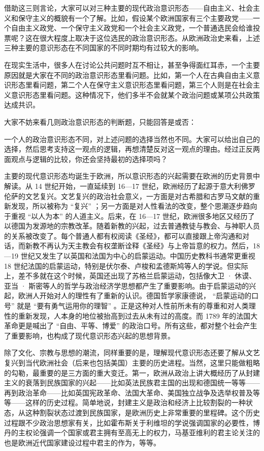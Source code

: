 借助这三则言论，大家可以对三种主要的现代政治意识形态——自由主义、社会主义和保守主义的概貌有一个了解。比如，假设某个欧洲国家有三个主要政党——一个自由主义政党、一个保守主义政党和一个社会主义政党，一个普通选民会给谁投票呢？这在很大程度上取决于这位选民的政治意识形态。从欧洲政治史来看，上述三种主要的意识形态在不同国家的不同时期均有过较大的影响。

在现实生活中，很多人在讨论公共问题时互不相让，甚至争得面红耳赤，一个主要原因就是大家在不同的政治意识形态里看问题。比如，第一个人在古典自由主义意识形态里看问题，第二个人在保守主义意识形态里看问题，第三个人则是在社会主义意识形态里看问题。这种情况下，他们多半不会就某个政治问题或某项公共政策达成共识。

大家不妨来看几则政治意识形态的判断题，只能回答是或否：


一个人的政治意识形态不同，对上述问题的选择当然也不同。大家可以给出自己的选择，然后思考支持这一观点的逻辑，再想清楚反对这一观点的理由。经过正反两面观点与逻辑的比较，你还会坚持最初的选择项吗？


主要的现代意识形态均诞生于欧洲，所以意识形态的兴起需要在欧洲的历史背景中解读。从 14 世纪开始，一直延续到 16—17 世纪，欧洲经历了起源于意大利佛罗伦萨的文艺复兴。文艺复兴的政治社会意义，一方面是对古希腊和古罗马文献的重新发现，所以被称为 “复兴” ；另一方面是对人性看法的改变，整个思潮逐步趋向于重视 “以人为本” 的人道主义。后来，在 16—17 世纪，欧洲很多地区又经历了以德国为发源地的宗教改革。随着新教的兴起，过去普通教徒与教会、与神职人员的关系被改变了。每个普通人都有权阅读《圣经》，都可以直接跟上帝沟通和对话，而新教不再认为天主教会有权垄断诠释《圣经》与上帝旨意的权力。然后，18—19 世纪又发生了以英国和法国为中心的启蒙运动。中国历史教科书通常更重视 18 世纪法国的启蒙运动，特别是伏尔泰、卢梭和孟德斯鸠等人的学说。但实际上，差不多就在这个时候，英国还出现了苏格兰启蒙运动，包括像大卫 · 休谟、亚当 · 斯密等人的哲学与政治经济学思想都产生了重要影响。由于启蒙运动的兴起，欧洲人开始对人的理性有了重新的认识。德国哲学家康德说， “启蒙运动的口号” 就是 “要有勇气运用你的理智” 。正是这种对人性前所未有的尊重和对人类理性的重新发现，人本身的地位被抬高到过去从未有过的高度。而 1789 年的法国大革命更是喊出了 “自由、平等、博爱” 的政治口号。所有这些，都对整个社会产生了重要影响，也构成了现代意识形态兴起的思想背景。

除了文化、宗教与思想的潮流，同样重要的是，理解现代意识形态还要了解从文艺复兴到当代欧洲社会（后来也包括美国）主要的历史进程。当然，这里只能做粗略的勾勒，最重要的是三方面的重大变迁。第一，欧洲从政治上讲大概经历了从封建主义的衰落到民族国家的兴起——比如英法民族君主国的出现和德国统一等等——再到政治革命——比如英国宪政革命、法国大革命、美国独立战争及选举权普及等等——这样的历史过程。简单地说，封建主义是政治和经济上比较割裂的一种状态，从这种割裂状态过渡到民族国家，是欧洲历史上非常重要的里程碑。这个历史过程跟不少政治思想家有关，比如霍布斯关于利维坦的学说强调国家的必要性，博丹的主权论强调一个国家或君主拥有至高无上的权力，马基亚维利的君主论关注的也是欧洲近代国家建设过程中君主的作为，等等。

